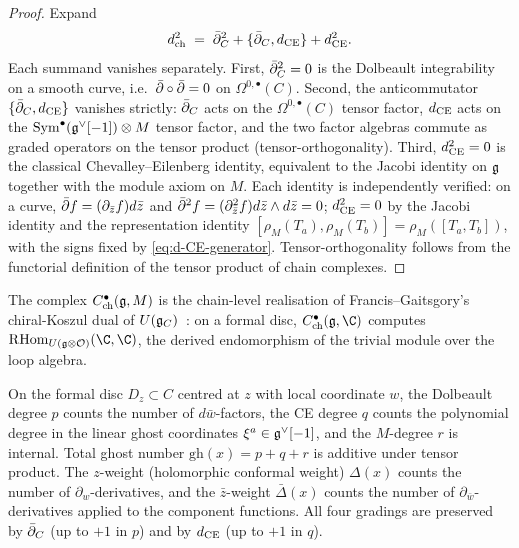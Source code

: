 \begin{proof}
Expand
\begin{equation}
d_{\mathrm{ch}}^2
\;=\;
\bar\partial_C^2 + \{\bar\partial_C, d_{\mathrm{CE}}\} + d_{\mathrm{CE}}^2.
\end{equation}
Each summand vanishes separately. First, $\bar\partial_C^2 = 0$ is the Dolbeault
integrability on a smooth curve, i.e.\ $\bar\partial\circ\bar\partial = 0$ on
$\Omega^{0,\bullet}(C)$. Second, the anticommutator
$\{\bar\partial_C, d_{\mathrm{CE}}\}$ vanishes strictly: $\bar\partial_C$ acts on the
$\Omega^{0,\bullet}(C)$ tensor factor, $d_{\mathrm{CE}}$ acts on the
$\mathrm{Sym}^\bullet(\mathfrak{g}^\vee[-1])\otimes M$ tensor factor, and the two factor
algebras commute as graded operators on the tensor product
(tensor-orthogonality). Third, $d_{\mathrm{CE}}^2 = 0$ is the classical
Chevalley--Eilenberg identity, equivalent to the Jacobi identity on
$\mathfrak{g}$ together with the module axiom on $M$. Each identity is
independently verified: on a curve,
$\bar\partial f=(\partial_{\bar z}f)d\bar z$ and
$\bar\partial^2f=(\partial_{\bar z}^2f)d\bar z\wedge d\bar z=0$;
$d_{\mathrm{CE}}^2 = 0$ by the Jacobi identity and the representation identity
$[\rho_M(T_a),\rho_M(T_b)]=\rho_M([T_a,T_b])$, with the signs fixed by
\eqref{eq:d-CE-generator}. Tensor-orthogonality follows from the
functorial definition of the tensor product of chain complexes.
\end{proof}

\begin{remark}
\label{rem:ch-ce-primary}
The complex $C^\bullet_{\mathrm{ch}}(\mathfrak{g},M)$ is the chain-level
realisation of Francis--Gaitsgory's chiral-Koszul dual of
$U(\mathfrak{g}_C)$~\cite[Thm.\,6.4.2]{FG12}: on a formal disc,
$C^\bullet_{\mathrm{ch}}(\fg,\C)$ computes $\mathrm{R}\mathrm{Hom}_{U(\fg\otimes\cO)}(\C,\C)$,
the derived endomorphism of the trivial module over the loop algebra.
\end{remark}

\begin{definition}
\label{def:tridegree-conventions}
%
On the formal disc $D_z\subset C$ centred at $z$ with local coordinate
$w$, the Dolbeault degree $p$ counts the number of $d\bar w$-factors,
the CE degree $q$ counts the polynomial degree in the linear ghost
coordinates $\xi^a\in\mathfrak{g}^\vee[-1]$, and the $M$-degree $r$ is internal.
Total ghost number $\mathrm{gh}(x) = p+q+r$ is additive under tensor
product. The $z$-weight (holomorphic conformal weight) $\Delta(x)$
counts the number of $\partial_w$-derivatives, and the $\bar z$-weight
$\bar\Delta(x)$ counts the number of $\partial_{\bar w}$-derivatives
applied to the component functions. All four gradings are preserved
by $\bar\partial_C$ (up to $+1$ in $p$) and by $d_{\mathrm{CE}}$ (up to $+1$ in $q$).
\end{definition}

